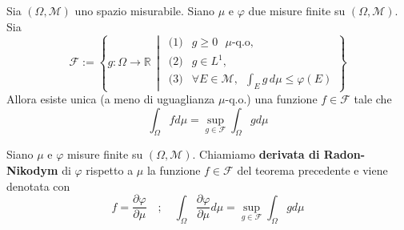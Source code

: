 \begin{theorem}\label{thm:dec_rad_nik}
    Sia \((\Omega, \mathcal{M})\) uno spazio misurabile. Siano \(\mu\) e
    \(\varphi\) due misure finite su \((\Omega, \mathcal{M})\). 
    Sia
    \[
        \mathcal{F} := \left\{ 
        g : \Omega \to \mathbb{R} \, \middle| \,
        \begin{array}{ll}
            \text{(1)} & g \geq 0 \text{ \(\mu\)-q.o}, \\
            \text{(2)} & g \in L^1, \\
            \text{(3)} & \forall E \in \mathcal{M}, \, \,\, \int_E g \, d\mu \leq \varphi(E)
        \end{array}
        \right\}
    \]
    Allora esiste unica (a meno di uguaglianza \(\mu\)-q.o.) una funzione \(f
    \in \mathcal{F}\) tale che \[
        \int_\Omega f d\mu = \sup_{g \in \mathcal{F}}  \int_\Omega g d\mu
    \]
\end{theorem}
\begin{definition}
\label{def:rad_nik_1}
    Siano \(\mu\) e \(\varphi \) misure finite su \((\Omega, \mathcal{M})\).
    Chiamiamo \textbf{derivata di Radon-Nikodym} di \(\varphi \) rispetto a
    \(\mu\) la funzione \(f \in \mathcal{F}\) del teorema precedente e viene
    denotata con
    \[
        f = \frac{\partial \varphi}{\partial \mu } \quad ;\quad \int_\Omega \frac{\partial
        \varphi}{\partial \mu } d\mu = \sup_{g \in \mathcal{F}} \int_\Omega g d\mu
    \]
\end{definition}
